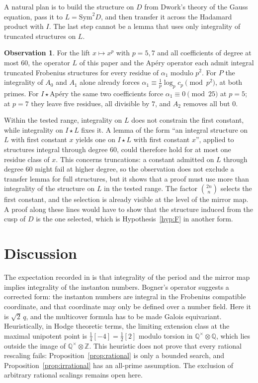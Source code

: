 \documentclass[11pt]{amsart}
\theoremstyle{definition}
\newtheorem{observation}[theorem]{Observation}
\theoremstyle{remark}
\newcommand{\Z}{\mathbb{Z}}
\newcommand{\Q}{\mathbb{Q}}
\begin{document}
A natural plan is to build the structure on $D$ from Dwork's theory of the Gauss
equation, pass it to $L=\mathrm{Sym}^2D$, and then transfer it across the Hadamard
product with $I$. The last step cannot be a lemma that uses only integrality of truncated
structures on $L$.

\begin{observation}\label{obs:transfer}
For the lift $x\mapsto x^p$ with $p=5,7$ and all coefficients of degree at most
$60$, the operator $L$ of this paper and the Ap\'ery operator each admit integral
truncated Frobenius structures for every residue of $\alpha_1$ modulo $p^2$. For $P$ the
integrality of $A_0$ and $A_1$ alone already forces $\alpha_1\equiv\frac1p\log_pc_p
\pmod{p^2}$, at both primes. For $I\star$Ap\'ery the same two coefficients force
$\alpha_1\equiv0\pmod{25}$ at $p=5$; at $p=7$ they leave five residues, all
divisible by $7$, and $A_2$ removes all but $0$.
\end{observation}

Within the tested range, integrality on $L$ does not constrain the first constant,
while integrality on $I\star L$ fixes it. A lemma of the form ``an integral
structure on $L$ with first constant $x$ yields one on $I\star L$ with first
constant $x$'', applied to structures integral through degree $60$, could therefore hold for at most one
residue class of $x$. This concerns truncations: a constant admitted on $L$ through degree $60$ might fail at
higher degree, so the observation does not exclude a transfer lemma for full structures, but it shows that a
proof must use more than integrality of the structure on $L$ in the tested range. The factor $\binom{2n}{n}$ selects the first constant, and the
selection is already visible at the level of the mirror map. A proof along these
lines would have to show that the structure induced from the cusp of $D$ is the
one selected, which is Hypothesis~\ref{hyp:F} in another form.


\section{Discussion}

The expectation recorded in \cite{vS17,AvS} is that integrality of the period and the mirror map
implies integrality of the instanton numbers. Bogner's operator suggests a corrected form: the
instanton numbers are integral in the Frobenius compatible coordinate, and that coordinate may only
be defined over a number field. Here it is $\sqrt2\,q$, and the multicover formula has to be made
Galois equivariant. Heuristically, in Hodge theoretic terms, the limiting extension class at the maximal unipotent
point is $\tfrac14[-4]=\tfrac12[2]$ modulo torsion in $\Q^\times\otimes\Q$, which lies outside the
image of $\Q^\times\otimes\Z$. This heuristic does not prove that every rational rescaling fails: Proposition~\ref{prop:rational} is only a bounded search, and Proposition~\ref{prop:irrational} has an all-prime assumption. The exclusion of arbitrary rational scalings remains open here.
\end{document}
